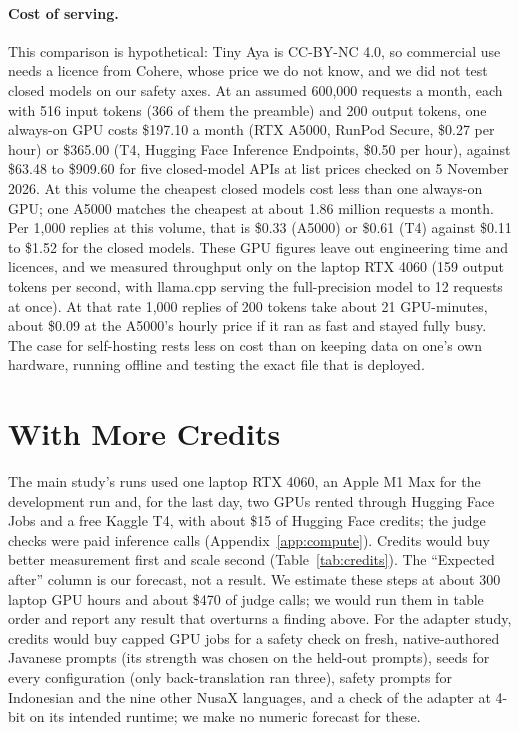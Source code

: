 \documentclass[11pt]{article}
\begin{document}
\paragraph{Cost of serving.} This comparison is hypothetical: Tiny Aya is CC-BY-NC 4.0, so commercial use needs a
licence from Cohere, whose price we do not know, and we did not test closed models on our safety axes. At an assumed
600,000 requests a month, each with 516 input tokens (366 of them the preamble) and 200 output tokens, one always-on
GPU costs \$197.10 a month (RTX A5000, RunPod Secure, \$0.27 per hour) or \$365.00 (T4, Hugging Face Inference
Endpoints, \$0.50 per hour), against \$63.48 to \$909.60 for five closed-model APIs at list prices checked on 5
November 2026. At this volume the cheapest closed models cost less than one always-on GPU; one A5000 matches the
cheapest at about 1.86 million requests a month. Per 1,000 replies at this volume, that is \$0.33 (A5000) or
\$0.61 (T4) against \$0.11 to \$1.52 for the closed models. These GPU figures leave out engineering time and
licences, and we measured throughput only on the laptop RTX 4060 (159 output tokens per second, with llama.cpp
serving the full-precision model to 12 requests at once). At that rate 1,000 replies of 200 tokens take about 21
GPU-minutes, about \$0.09 at the A5000's hourly price if it ran as fast and stayed fully busy. The case for self-hosting rests less on cost than on keeping data on
one's own hardware, running offline and testing the exact file that is deployed.

\section{With More Credits}\label{app:credits}

The main study's runs used one laptop RTX 4060, an Apple M1 Max for the development run and, for the last day, two
GPUs rented through Hugging Face Jobs and a free Kaggle T4, with about \$15 of Hugging Face credits; the judge checks
were paid inference calls (Appendix~\ref{app:compute}). Credits
would buy better measurement first and scale second (Table~\ref{tab:credits}). The ``Expected after'' column is our
forecast, not a result. We estimate these steps at about 300 laptop GPU hours and about \$470 of judge calls; we would
run them in table order and report any result that overturns a finding above. For the adapter study, credits would
buy capped GPU jobs for a safety check on fresh, native-authored Javanese prompts (its strength was chosen on the
held-out prompts), seeds for every configuration (only back-translation ran three), safety prompts for Indonesian and
the nine other NusaX languages, and a check of the adapter at 4-bit on its intended runtime; we make no numeric
forecast for these.
\end{document}
